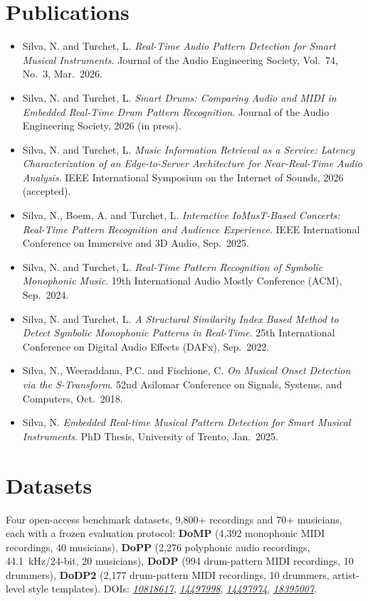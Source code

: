\documentclass[11pt]{article}
\begin{document}
\section*{Publications }
\begin{itemize}[leftmargin=1.2em, itemsep=-0.25em]
    \item Silva, N. and Turchet, L. \textit{Real-Time Audio Pattern Detection for Smart Musical Instruments}. Journal of the Audio Engineering Society, Vol.~74, No.~3, Mar.~2026.
    \item Silva, N. and Turchet, L. \textit{Smart Drums: Comparing Audio and MIDI in Embedded Real-Time Drum Pattern Recognition}. Journal of the Audio Engineering Society, 2026 (in press).
    \item Silva, N. and Turchet, L. \textit{Music Information Retrieval as a Service: Latency Characterization of an Edge-to-Server Architecture for Near-Real-Time Audio Analysis}. IEEE International Symposium on the Internet of Sounds, 2026 (accepted).
    \item Silva, N., Boem, A. and Turchet, L. \textit{Interactive IoMusT-Based Concerts: Real-Time Pattern Recognition and Audience Experience}. IEEE International Conference on Immersive and 3D Audio, Sep.~2025.
    \item Silva, N. and Turchet, L. \textit{Real-Time Pattern Recognition of Symbolic Monophonic Music}. 19th International Audio Mostly Conference (ACM), Sep.~2024.
    \item Silva, N. and Turchet, L. \textit{A Structural Similarity Index Based Method to Detect Symbolic Monophonic Patterns in Real-Time}. 25th International Conference on Digital Audio Effects (DAFx), Sep.~2022.
    \item Silva, N., Weeraddana, P.C. and Fischione, C. \textit{On Musical Onset Detection via the S-Transform}. 52nd Asilomar Conference on Signals, Systems, and Computers, Oct.~2018.
    \item Silva, N. \textit{Embedded Real-time Musical Pattern Detection for Smart Musical Instruments}. PhD Thesis, University of Trento, Jan.~2025.
\end{itemize}

\section*{Datasets }
Four open-access benchmark datasets, 9,800+ recordings and 70+ musicians, each with a frozen evaluation protocol: \textbf{DoMP} (4,392 monophonic MIDI recordings, 40 musicians), \textbf{DoPP} (2,276 polyphonic audio recordings, 44.1~kHz/24-bit, 20 musicians), \textbf{DoDP} (994 drum-pattern MIDI recordings, 10 drummers), \textbf{DoDP2} (2,177 drum-pattern MIDI recordings, 10 drummers, artist-level style templates). DOIs: \href{https://doi.org/10.5281/zenodo.10818617}{\textit{10818617}}, \href{https://doi.org/10.5281/zenodo.14497998}{\textit{14497998}}, \href{https://doi.org/10.5281/zenodo.14497974}{\textit{14497974}}, \href{https://doi.org/10.5281/zenodo.18395007}{\textit{18395007}}.
\end{document}
